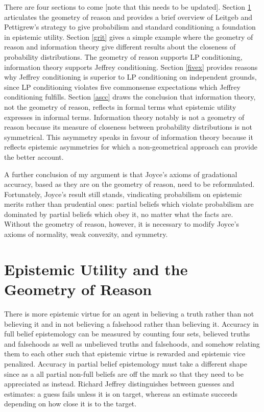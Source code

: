 \documentclass[11pt]{article}
\begin{document}
There are four sections to come [note that this needs to be updated].
Section \ref{eugr} articulates the geometry of reason and provides a
brief overview of Leitgeb and Pettigrew's strategy to give probabilism
and standard conditioning a foundation in epistemic utility. Section
\ref{grit} gives a simple example where the geometry of reason and
information theory give different results about the closeness of
probability distributions. The geometry of reason supports LP
conditioning, information theory supports Jeffrey conditioning.
Section \ref{fivex} provides reasons why Jeffrey conditioning is
superior to LP conditioning on independent grounds, since LP
conditioning violates five commonsense expectations which Jeffrey
conditioning fulfills. Section \ref{ascc} draws the conclusion that
information theory, not the geometry of reason, reflects in formal
terms what epistemic utility expresses in informal terms. Information
theory notably is not a geometry of reason because its measure of
closeness between probability distributions is not symmetrical. This
asymmetry speaks in favour of information theory because it reflects
epistemic asymmetries for which a non-geometrical approach can provide
the better account.

A further conclusion of my argument is that Joyce's axioms of
gradational accuracy, based as they are on the geometry of reason,
need to be reformulated. Fortunately, Joyce's result still stands,
vindicating probabilism on epistemic merits rather than prudential
ones: partial beliefs which violate probabilism are dominated by
partial beliefs which obey it, no matter what the facts are. Without
the geometry of reason, however, it is necessary to modify Joyce's
axioms of normality, weak convexity, and symmetry.

\section{Epistemic Utility and the Geometry of Reason}
\label{eugr}

There is more epistemic virtue for an agent in believing a truth
rather than not believing it and in not believing a falsehood rather
than believing it. Accuracy in full belief epistemology can be
measured by counting four sets, believed truths and falsehoods as well
as unbelieved truths and falsehoods, and somehow relating them to each
other such that epistemic virtue is rewarded and epistemic vice
penalized. Accuracy in partial belief epistemology must take a
different shape since as a  all partial non-full beliefs
are off the mark so that they need to be appreciated as
 instead. Richard Jeffrey distinguishes between
guesses and estimates: a guess fails unless it is on target, whereas
an estimate succeeds depending on how close it is to the target.
\end{document}
